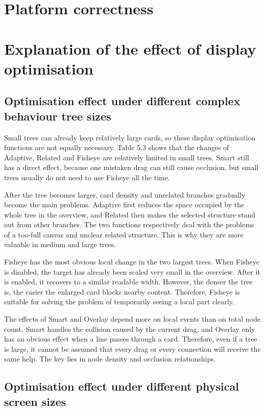 \documentclass[11pt,a4paper,oneside,extrafontsizes]{memoir}
\begin{document}
\section{Platform correctness}

\section{Explanation of the effect of display optimisation}

\subsection{Optimisation effect under different complex behaviour tree sizes}

Small trees can already keep relatively large cards, so these display optimisation functions are not equally necessary. Table 5.3 shows that the changes of Adaptive, Related and Fisheye are relatively limited in small trees. Smart still has a direct effect, because one mistaken drag can still cause occlusion, but small trees usually do not need to use Fisheye all the time.

After the tree becomes larger, card density and unrelated branches gradually become the main problems. Adaptive first reduces the space occupied by the whole tree in the overview, and Related then makes the selected structure stand out from other branches. The two functions respectively deal with the problems of a too-full canvas and unclear related structure. This is why they are more valuable in medium and large trees.

Fisheye has the most obvious local change in the two largest trees. When Fisheye is disabled, the target has already been scaled very small in the overview. After it is enabled, it recovers to a similar readable width. However, the denser the tree is, the easier the enlarged card blocks nearby content. Therefore, Fisheye is suitable for solving the problem of temporarily seeing a local part clearly.

The effects of Smart and Overlay depend more on local events than on total node count. Smart handles the collision caused by the current drag, and Overlay only has an obvious effect when a line passes through a card. Therefore, even if a tree is large, it cannot be assumed that every drag or every connection will receive the same help. The key lies in node density and occlusion relationships.

\subsection{Optimisation effect under different physical screen sizes}
\end{document}
